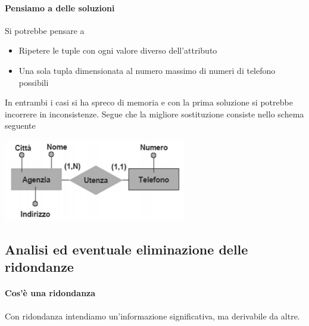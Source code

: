 \paragraph{Pensiamo a delle soluzioni} Si potrebbe pensare a 
\begin{itemize}
	\item Ripetere le tuple con ogni valore diverso dell'attributo
	\item Una sola tupla dimensionata al numero massimo di numeri di telefono possibili
\end{itemize}
In entrambi i casi si ha spreco di memoria  e con la prima soluzione si potrebbe incorrere in inconsistenze. Segue che la migliore sostituzione consiste nello schema seguente
\begin{center}
	\includegraphics{images/108.PNG}
\end{center}
\subsection{Analisi ed eventuale eliminazione delle ridondanze}
\paragraph{Cos'è una ridondanza} Con ridondanza intendiamo un'informazione significativa, ma derivabile da altre.
